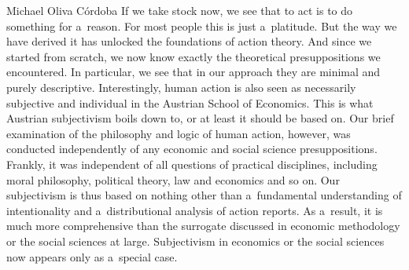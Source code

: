 \begin{artengenv}{Michael Oliva Córdoba}
If we take stock now, we see that to act is to do something for a~reason. For most people this is just a~platitude. But the way we have derived it has unlocked the foundations of action theory. And since we started from scratch, we now know exactly the theoretical presuppositions we encountered. In particular, we see that in our approach they are minimal and purely descriptive. Interestingly, human action is also seen as necessarily subjective and individual in the Austrian School of Economics. This is what Austrian subjectivism boils down to, or at least it should be based on. Our brief examination of the philosophy and logic of human action, however, was conducted independently of any economic and social science presuppositions. Frankly, it was independent of all questions of practical disciplines, including moral philosophy, political theory, law and economics and so on. Our subjectivism is thus based on nothing other than a~fundamental understanding of intentionality and a~distributional analysis of action reports. As a~result, it is much more comprehensive than the surrogate discussed in economic methodology or the social sciences at large. Subjectivism in economics or the social sciences now appears only as a~special case.




\end{artengenv}
